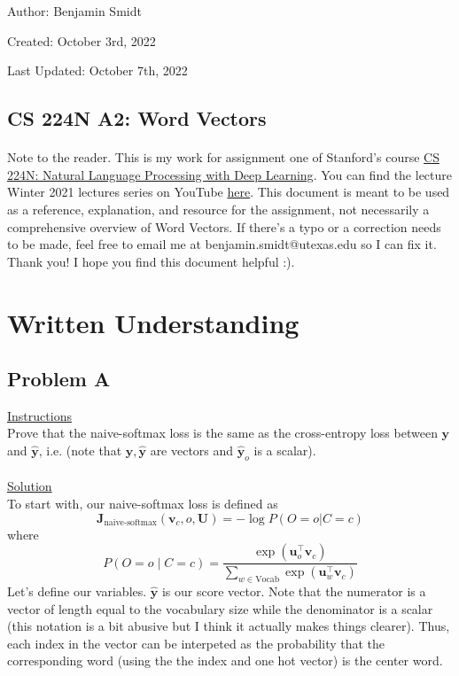 \documentclass[12pt]{article}
\begin{document}
\noindent Author: Benjamin Smidt

\noindent Created: October 3rd, 2022

\noindent Last Updated: October 7th, 2022
\begin{center}
\section*{CS 224N A2: Word Vectors}
\end{center}

\paragraph{} Note to the reader. This is my work for assignment one of Stanford's course
\href{https://web.stanford.edu/class/cs224n/}{CS 224N: Natural Language Processing with Deep Learning}. 
You can find the lecture Winter 2021 lectures series on YouTube \href{https://www.youtube.com/playlist?list=PLoROMvodv4rOSH4v6133s9LFPRHjEmbmJ}{here}.
This document is meant to be used as a reference, explanation, and resource for the assignment, 
not necessarily a comprehensive overview of Word Vectors. If there's a typo or a correction 
needs to be made, feel free to email me at benjamin.smidt@utexas.edu so I can fix it. 
Thank you! I hope you find this document helpful :). 

\tableofcontents{}

\newpage

\section{Written Understanding}

\subsection{Problem A}
\underline{Instructions}
~\\
Prove that the naive-softmax loss is the same as the cross-entropy 
loss between $\bm y$ and $\hat{\bm y}$, i.e. (note that $\bm y, \hat{\bm y}$ 
are vectors and $\hat{\bm y}_o$ is a scalar).
~\\
~\\
\underline{Solution}
~\\
To start with, our naive-softmax loss is defined as
\begin{equation*}
    \bm J_{\text{naive-softmax}}(\bm v_c, o, \bm U) = -\log P(O=o| C=c)
\end{equation*}
where 
\begin{equation*}
P(O=o \mid C=c) = \frac{\exp(\bm u_{o}^\top \bm v_c)}{\sum_{w \in \text{Vocab}} \exp(\bm u_{w}^\top \bm v_c)}
\end{equation*}
Let's define our variables. $ \hat{\bm y}$ is our score vector. Note that the 
numerator is a vector of length equal to the vocabulary size while the denominator is a scalar (this notation 
is a bit abusive but I think it actually makes things clearer). Thus, each index 
in the vector can be interpeted as the probability that the corresponding word (using the 
the index and one hot vector) is the center word. 
\end{document}

